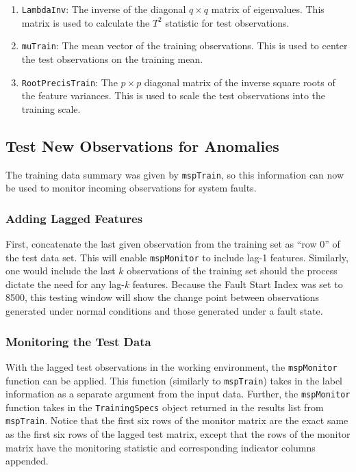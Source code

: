 \documentclass{report}\usepackage[]{graphicx}\usepackage[]{color}
\begin{document}
\begin{enumerate}
\begin{enumerate}
    \item \texttt{LambdaInv}: The inverse of the diagonal $q \times q$ matrix of eigenvalues. This matrix is used to calculate the $T^2$ statistic for test observations.
    \item \texttt{muTrain}: The mean vector of the training observations. This is used to center the test observations on the training mean.
    \item \texttt{RootPrecisTrain}: The $p \times p$ diagonal matrix of the inverse square roots of the feature variances. This is used to scale the test observations into the training scale.
	\end{enumerate}
\end{enumerate}


\subsection{Test New Observations for Anomalies}
The training data summary was given by \texttt{mspTrain}, so this information can now be used to monitor incoming observations for system faults.

\subsubsection{Adding Lagged Features}
First, concatenate the last given observation from the training set as ``row 0'' of the test data set. This will enable \texttt{mspMonitor} to include lag-1 features. Similarly, one would include the last $k$ observations of the training set should the process dictate the need for any lag-$k$ features. Because the Fault Start Index was set to 8500, this testing window will show the change point between observations generated under normal conditions and those generated under a fault state.

\subsubsection{Monitoring the Test Data}
With the lagged test observations in the working environment, the \texttt{mspMonitor} function can be applied. This function (similarly to \texttt{mspTrain}) takes in the label information as a separate argument from the input data. Further, the \texttt{mspMonitor} function takes in the \texttt{TrainingSpecs} object returned in the results list from \texttt{mspTrain}. Notice that the first six rows of the monitor matrix are the exact same as the first six rows of the lagged test matrix, except that the rows of the monitor matrix have the monitoring statistic and corresponding indicator columns appended.
\end{document}
